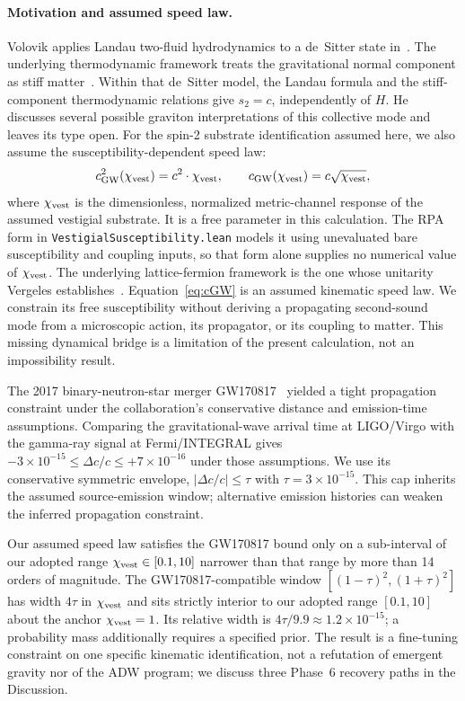 \documentclass[aps,prl,reprint,nofootinbib,superscriptaddress]{revtex4-2}
\newcommand{\cGW}{c_{\rm GW}}
\newcommand{\chivest}{\chi_{\rm vest}}
\newcommand{\dccap}{\Delta c/c}
\begin{document}
\paragraph{Motivation and assumed speed law.}
Volovik applies Landau two-fluid hydrodynamics to a de~Sitter
state in~\cite{Volovik2026SecondSound}.
The underlying thermodynamic framework treats the gravitational
normal component as stiff matter~\cite{Volovik2024VacuumDecay}.
Within that de~Sitter model, the Landau formula and the stiff-component
thermodynamic relations give $s_2=c$, independently of $H$.
He discusses several possible graviton interpretations of this
collective mode and leaves its type open.
For the spin-2 substrate identification assumed here, we also assume
the susceptibility-dependent speed law:
\begin{equation}
  \cGW^2(\chivest) = c^2 \cdot \chivest, \qquad
  \cGW(\chivest) = c\sqrt{\chivest},
  \label{eq:cGW}
\end{equation}
where $\chivest$ is the dimensionless, normalized metric-channel
response of the assumed vestigial substrate.
It is a free parameter in this calculation.
The RPA form in \texttt{VestigialSusceptibility.lean} models it using
unevaluated bare susceptibility and coupling inputs, so that form
alone supplies no numerical value of $\chivest$.
The underlying
lattice-fermion framework is the one whose unitarity Vergeles
establishes~\cite{Vergeles2025}. Equation~\eqref{eq:cGW} is an
assumed kinematic speed law.
We constrain its free susceptibility without deriving a propagating
second-sound mode from a microscopic action, its propagator, or its
coupling to matter. This missing dynamical bridge is a limitation of
the present calculation, not an impossibility result.

The 2017 binary-neutron-star merger
GW170817~\cite{Abbott2017GW170817} yielded a tight propagation
constraint under the collaboration's conservative distance and
emission-time assumptions. Comparing the gravitational-wave arrival
time at LIGO/Virgo with the gamma-ray signal at Fermi/INTEGRAL gives
$-3 \times 10^{-15} \leq \dccap \leq +7 \times 10^{-16}$
under those assumptions. We use its conservative symmetric envelope,
$|\dccap| \leq \tau$ with $\tau = 3 \times 10^{-15}$.
This cap inherits the assumed source-emission window; alternative
emission histories can weaken the inferred propagation constraint.

Our assumed speed law satisfies the GW170817 bound only on a
sub-interval of our adopted range $\chivest \in [0.1, 10]$ narrower
than that range by more than 14 orders of magnitude. The
GW170817-compatible window $[(1-\tau)^2, (1+\tau)^2]$ has width
$4\tau$ in $\chivest$ and sits strictly interior to our adopted range
$[0.1, 10]$ about the anchor $\chivest = 1$.
Its relative width is $4\tau/9.9 \approx 1.2\times10^{-15}$;
a probability mass additionally requires a specified prior. The result is a fine-tuning constraint on one specific
kinematic identification, not a refutation of emergent
gravity nor of the ADW program; we discuss three Phase~6 recovery
paths in the Discussion.
\end{document}
